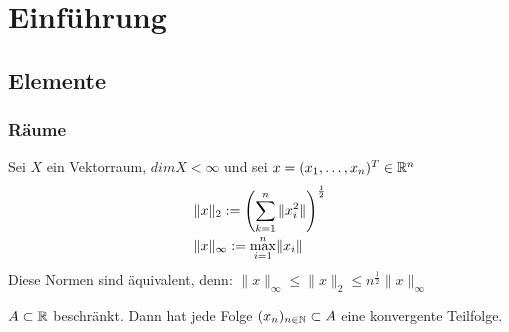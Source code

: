 \chapter*{Einf{\"u}hrung} 
  
\section{Elemente}

\subsection{R{\"a}ume}
Sei $X$ ein Vektorraum, $dim X < \infty $ und sei $x = (x_{1},\dotsc,x_{n})^{T} \in \mathbb{R}^{n}$
\begin{align*}
	& \|x\|_{2} := \left(\sum_{k = 1}^{n} \|x_{i}^{2}\| \right)^{\frac{1}{2}}\\
	& \|x\|_{\infty} := \smash{\displaystyle\max_{i = 1}^{n}}  \|x_{i}\|		
\end{align*}	

Diese Normen sind äquivalent, denn:
$\| x \|_{\infty} \leq \| x \|_{2} \leq n^{\frac{1}{2}} \| x \|_{\infty}$ \newline

\begin{satz}  \label{satz:1.1-BolzanoWeierstrass}
$A \subset \mathbb{R}$ beschränkt. Dann hat jede Folge $(x_{n})_{n \in \mathbb{N}} \subset A$ eine konvergente Teilfolge.
\end{satz}

